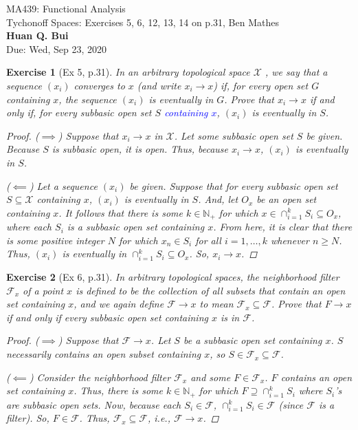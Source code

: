 \documentclass[11pt]{article}
\newtheorem{exercise}{Exercise}
\newcommand{\N}{\mathbb{N}}
\newcommand{\F}{\mathcal{F}}
\newcommand{\X}{\mathcal{X}}
\begin{document}
\begin{center}
\begin{framed}
{\Large  MA439: Functional Analysis\\
	 Tychonoff Spaces:  Exercises 5, 6, 12, 13, 14 on p.31, Ben Mathes}\\
$\,$\\
{\Large \bf  Huan Q. Bui\\}
$\,$\\
{\Large Due: Wed, Sep 23, 2020}
\end{framed}
\end{center}

\begin{exercise}[Ex 5, p.31]
	In an arbitrary topological space $\X$ , we say that a sequence $(x_i)$ converges to $x$ (and write $x_i \to x$) if, for every open set $G$ containing $x$, the sequence
	$(x_i)$ is eventually in $G$. Prove that $x_i \to x$ if and only if, for every subbasic open set $S$ \textcolor{blue}{containing $x$}, $(x_i)$ is eventually in $S$.
	\begin{proof}
		($\implies$) Suppose that $x_i \to x$ in $\X$. Let some subbasic open set $S$ be given. Because $S$ is subbasic open, it is open. Thus, because $x_i \to x$, $(x_i)$ is eventually in $S$.
		
		($\impliedby$) Let a sequence $(x_i)$ be given. Suppose that for every subbasic open set $S \subseteq \X$ containing $x$, $(x_i)$ is eventually in $S$. And, let $O_x$ be an open set containing $x$. It follows that there is some $k \in \N_+$ for which $x\in \cap^k_{i=1}S_i \subseteq O_x$, where each $S_i$ is a subbasic open set containing $x$. From here, it is clear that there is some positive integer $N$ for which $x_n \in S_i$ for all $i = 1,\dots,k$ whenever $n \geq N$. Thus, $(x_i)$ is eventually in $\cap^k_{i=1}S_i \subseteq O_x$. So, $x_i \to x$. 
 	\end{proof}
\end{exercise}

\begin{exercise}[Ex 6, p.31]
	In arbitrary topological spaces, the neighborhood filter $\F_x$ of a point $x$ is
	defined to be the collection of all subsets that contain an open set containing
	$x$, and we again define $\F \to x$ to mean $\F_x \subseteq \F$. Prove that $F \to x$ if and only if every subbasic open set containing $x$ is in $\F$.
	\begin{proof}
		($\implies$) Suppose that $\F \to x$. Let $S$ be a subbasic open set containing $x$. $S$ necessarily contains an open subset containing $x$, so $S\in \F_x \subseteq \F$.
		
		($\impliedby$) Consider the neighborhood filter $\F_x$ and some $F\in \F_x$. $F$ contains an open set containing $x$. Thus, there is some $k \in \N_+$ for which $F\supseteq \cap^k_{i=1}S_i$ where $S_i$'s are subbasic open sets. Now, because each $S_i \in \F$, $\cap^k_{i=1}S_i \in \F$ (since $\F$ is a filter). So, $F \in \F$. Thus, $\F_x \subseteq \F$, i.e., $\F \to x$. 
	\end{proof}
\end{exercise}
\end{document}
